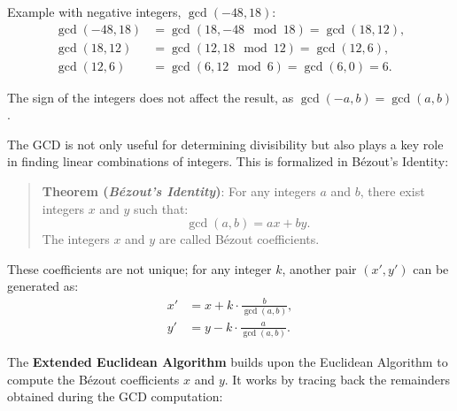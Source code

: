 \documentclass[
  letterpaper,
  DIV=11,
  numbers=noendperiod,
  oneside]{scrartcl}
\begin{document}
Example with negative integers, \(\gcd(-48, 18)\): \[
\begin{aligned}
\gcd(-48, 18) &= \gcd(18, -48 \mod 18) = \gcd(18, 12), \\
\gcd(18, 12) &= \gcd(12, 18 \mod 12) = \gcd(12, 6), \\
\gcd(12, 6) &= \gcd(6, 12 \mod 6) = \gcd(6, 0) = 6.
\end{aligned}
\]

The sign of the integers does not affect the result, as
\(\gcd(-a, b) = \gcd(a, b)\).

The GCD is not only useful for determining divisibility but also plays a
key role in finding linear combinations of integers. This is formalized
in Bézout's Identity:

\begin{quote}
\textbf{Theorem (\emph{Bézout's Identity})}: For any integers \(a\) and
\(b\), there exist integers \(x\) and \(y\) such that: \[
\gcd(a, b) = ax + by.
\] The integers \(x\) and \(y\) are called Bézout coefficients.
\end{quote}

These coefficients are not unique; for any integer \(k\), another pair
\((x', y')\) can be generated as: \[
\begin{aligned}
x' &= x + k \cdot \frac{b}{\gcd(a, b)}, \\
y' &= y - k \cdot \frac{a}{\gcd(a, b)}.
\end{aligned}
\]

The \textbf{Extended Euclidean Algorithm} builds upon the Euclidean
Algorithm to compute the Bézout coefficients \(x\) and \(y\). It works
by tracing back the remainders obtained during the GCD computation:
\end{document}
